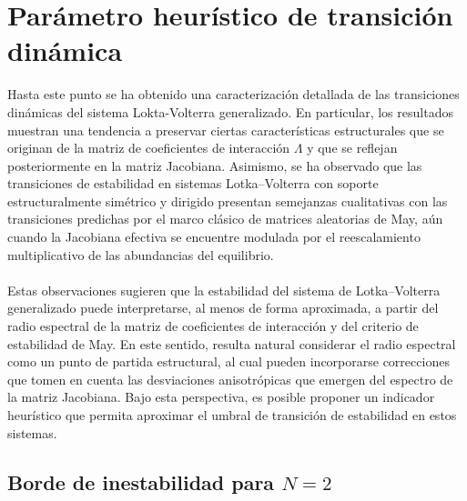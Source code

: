 \section{Parámetro heurístico de transición dinámica}


Hasta este punto se ha obtenido una caracterización detallada de las transiciones dinámicas del sistema Lokta-Volterra generalizado. En particular, los resultados muestran una tendencia a preservar ciertas características estructurales que se originan de la matriz de coeficientes de interacción $\Lambda$ y que se reflejan posteriormente en la matriz Jacobiana. Asimismo, se ha observado que las transiciones de estabilidad en sistemas Lotka--Volterra con soporte estructuralmente simétrico y dirigido presentan semejanzas cualitativas con las transiciones predichas por el marco clásico de matrices aleatorias de May, aún cuando la Jacobiana efectiva se encuentre modulada por el reescalamiento multiplicativo de las abundancias del equilibrio.
\\
\\
Estas observaciones sugieren que la estabilidad del sistema de Lotka--Volterra generalizado puede interpretarse, al menos de forma aproximada, a partir del radio espectral de la matriz de coeficientes de interacción y del criterio de estabilidad de May. En este sentido, resulta natural considerar el radio espectral como un punto de partida estructural, al cual pueden incorporarse correcciones que tomen en cuenta las desviaciones anisotrópicas que emergen del espectro de la matriz Jacobiana. Bajo esta perspectiva, es posible proponer un indicador heurístico que permita aproximar el umbral de transición de estabilidad en estos sistemas.

\subsection{Borde de inestabilidad para $N=2$}

